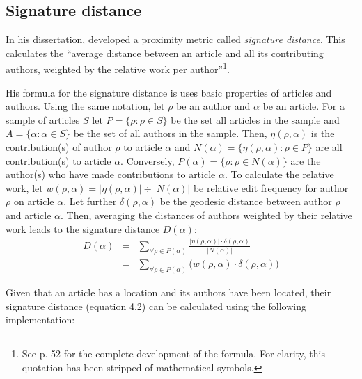 

\subsection{Signature distance}

In his dissertation, \textcite{hardy2011volunteered} developed a proximity metric called \emph{signature distance}.
This calculates the ``average distance between an article and all its contributing authors, weighted by the relative work
per author''\footnote{See p. 52 for the complete development of the formula. For clarity, this quotation has been stripped of mathematical symbols.}.

His formula for the signature distance is uses basic properties of articles and authors.
Using the same notation, let $\rho$ be an author and $\alpha$ be an article.
For a sample of articles $S$ let $P = \{\rho : \rho \in S\}$ be the set all articles in the sample and $A = \{\alpha : \alpha \in S\}$ be the set of all authors in the sample.
Then, $\eta(\rho,\alpha)$ is the contribution(s) of author $\rho$ to article $\alpha$ and $N(\alpha) = \{\eta(\rho,\alpha) : \rho \in P\}$ are all contribution(s) to article $\alpha$.
Conversely, $P(\alpha) = \{\rho : \rho \in N(\alpha)\}$ are the author(s) who have made contributions to article $\alpha$.
To calculate the relative work, let $w(\rho,\alpha) = |\eta(\rho,\alpha)| \div |N(\alpha)|$ be relative edit frequency for author $\rho$ on article $\alpha$. 
Let further $\delta(\rho,\alpha)$ be the geodesic distance between author $\rho$ and article $\alpha$.
Then, averaging the distances of authors weighted by their relative work leads to the signature distance $D(\alpha)$:
\begin{eqnarray}
D(\alpha) & = & \sum_{\forall \rho \in P(\alpha)} \frac{|\eta(\rho,\alpha)| \cdot \delta(\rho,\alpha)}{|N(\alpha)|} \\
 & = &  \sum_{\forall \rho \in P(\alpha)} \big(w(\rho,\alpha) \cdot \delta(\rho,\alpha)\big)
\end{eqnarray}

Given that an article has a location and its authors have been located, their signature distance (equation 4.2) can be calculated using the following implementation:

